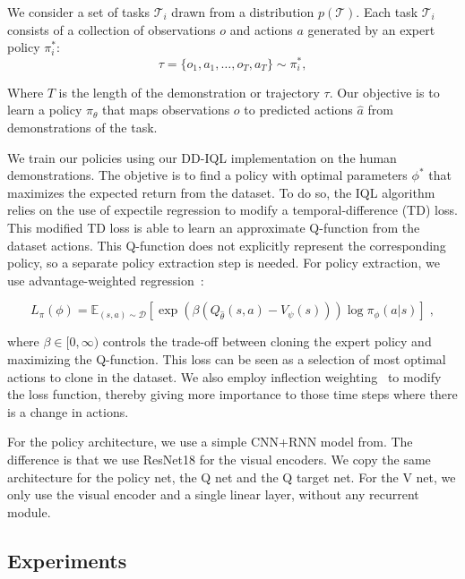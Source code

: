 We consider a set of tasks $\mathcal{T}_i$ drawn from a distribution $p(\mathcal{T})$.
Each task $\mathcal{T}_i$ consists of a collection of observations $o$ and actions $a$ generated by an expert policy $\pi^*_i$:
\begin{equation}
    \tau = \{o_1, a_1, \dots, o_T, a_T\} \sim \pi^*_i,
\end{equation}

Where $T$ is the length of the demonstration or trajectory $\tau$.
Our objective is to learn a policy $\pi_\theta$ that maps observations $o$ to predicted actions $\hat{a}$ from demonstrations of the task.


We train our policies using our DD-IQL implementation on the human demonstrations.
The objetive is to find a policy with optimal parameters $\phi^*$ that maximizes the expected return from the dataset.
To do so, the IQL algorithm relies on the use of expectile regression to modify a temporal-difference (TD) loss.
This modified TD loss is able to learn an approximate Q-function from the dataset actions.
This Q-function does not explicitly represent the corresponding policy, so a separate policy extraction step is needed.
For policy extraction, we use advantage-weighted regression~\cite{peters2007, peng2019advantageweighted}:

\begin{equation}
    L_\pi(\phi)=\mathbb{E}_{(s, a) \sim \mathcal{D}}\left[\exp \left(\beta\left(Q_{\hat{\theta}}(s, a)-V_\psi(s)\right)\right) \log \pi_\phi(a|s)\right]\; ,
    \label{eq:loss}
\end{equation}

where $\beta \in [0, \infty)$ controls the trade-off between cloning the expert policy and maximizing the Q-function.
This loss can be seen as a selection of most optimal actions to clone in the dataset.
We also employ inflection weighting~\cite{wijmans2019} to modify the loss function, thereby giving more importance to those time steps where there is a change in actions.

For the policy architecture, we use a simple CNN+RNN model from\cite{ramrakhya2023}.
The difference is that we use ResNet18 for the visual encoders.
We copy the same architecture for the policy net, the Q net and the Q target net.
For the V net, we only use the visual encoder and a single linear layer, without any recurrent module.

\subsection{Experiments}\label{subsec:experiments_metanav}

